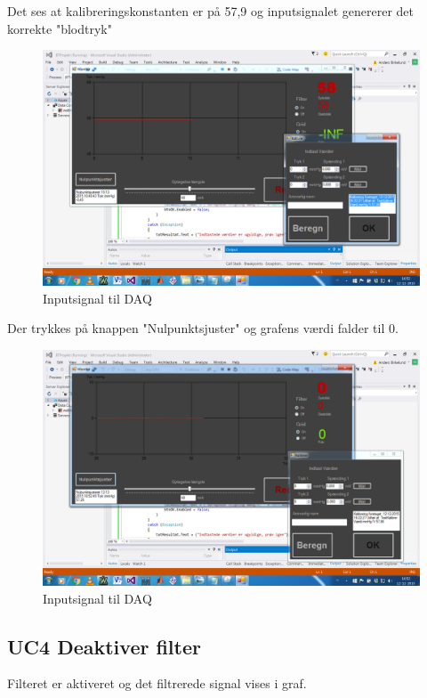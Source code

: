 Det ses at kalibreringskonstanten er på 57,9 og inputsignalet genererer det korrekte "blodtryk"
\begin{figure}[H]
	\centering
	\includegraphics[width=1\textwidth]{Figurer/Test_Nul_2}
	\caption{Inputsignal til DAQ}
\end{figure}

Der trykkes på knappen "Nulpunktsjuster" og grafens værdi falder til 0. 

\begin{figure}[H]
	\centering
	\includegraphics[width=1\textwidth]{Figurer/Test_Nul_3}
	\caption{Inputsignal til DAQ}
\end{figure}


\subsection{UC4 Deaktiver filter}

Filteret er aktiveret og det filtrerede signal vises i graf.

